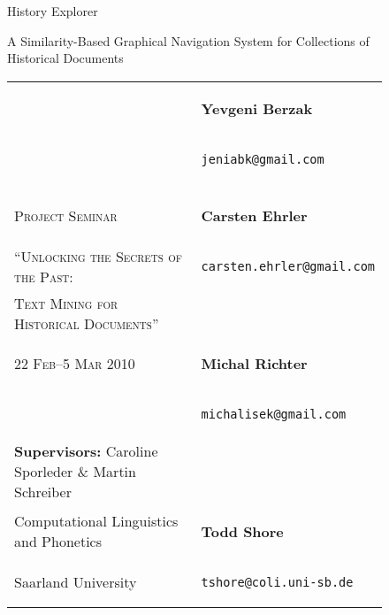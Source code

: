 \documentclass[paper=a4,draft=false]{scrartcl}
\begin{document}
\ifpdf
{}
\else
{}
\fi


\begin{titlepage}
\begin{figure}[ht]
\sc\centering
\vspace{20mm}
  \begin{Huge}
     History Explorer\\
  \end{Huge}
  \vspace{20mm}
  \begin{Large}A Similarity-Based Graphical Navigation System for Collections of Historical Documents\end{Large}
\end{figure}

	\begin{figure}[b]
    \begin{tabular}{l l}
      ~ & \begin{large}\textbf{Yevgeni Berzak}\end{large} \\
      ~ & \begin{large}\texttt{jeniabk@gmail.com} \end{large}\\
      \\
      \textsc{Project Seminar} & \begin{large}\textbf{Carsten Ehrler}\end{large} \\
       \textsc{``Unlocking the Secrets of the Past:} & \begin{large}\texttt{carsten.ehrler@gmail.com} \end{large}\\
        \textsc{Text Mining for Historical Documents''} & \\
       \textsc{22 Feb--5 Mar 2010} & \begin{large}\textbf{Michal Richter}\end{large} \\
       & \begin{large}\texttt{michalisek@gmail.com} \end{large}\\
      \textbf{Supervisors:} Caroline Sporleder \& Martin Schreiber & \\
      Computational Linguistics and Phonetics & \begin{large}\textbf{Todd Shore}\end{large} \\
      Saarland University & \begin{large}\texttt{tshore@coli.uni-sb.de} \end{large}
    \end{tabular} 
    \end{figure}
\end{titlepage}
\pagebreak
\end{document}
